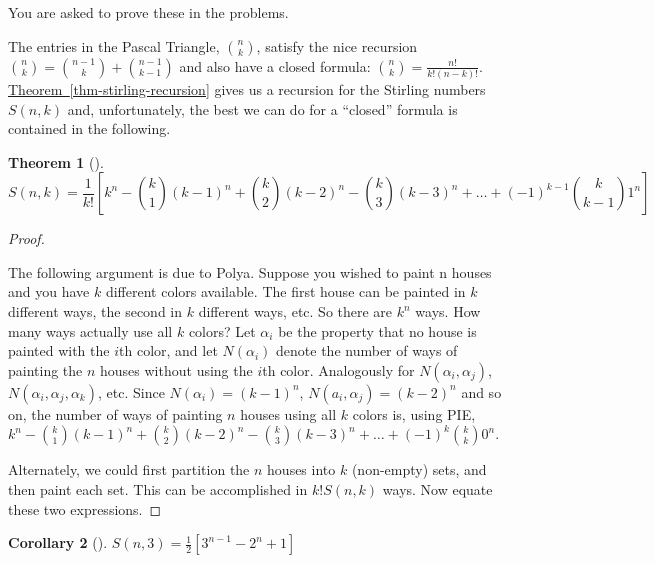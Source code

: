 \documentclass[10pt,]{book}
\theoremstyle{plain}
\newtheorem{theorem}{Theorem}[section]
\newtheorem{corollary}[theorem]{Corollary}
\theoremstyle{definition}
\theoremstyle{definition}
\numberwithin{equation}{chapter}
\begin{document}
\hypertarget{p-120}{}%
You are asked to prove these in the problems.%
\par
\hypertarget{p-121}{}%
The entries in the Pascal Triangle, \(\binom{n}{k}\), satisfy the nice recursion \(\binom{n}{k} = \binom{n - 1}{k} + \binom{n - 1}{k - 1}\) and also have a closed formula: \(\binom{n}{k} = \frac{n!}{k!(n - k)!}\). \hyperref[thm-stirling-recursion]{Theorem~\ref{thm-stirling-recursion}} gives us a recursion for the Stirling numbers \(S(n,k)\) and, unfortunately, the best we can do for a ``closed'' formula is contained in the following.%
\begin{theorem}[{}]\label{thm-stirling-closed}
\hypertarget{p-122}{}%
%
\begin{equation*}
S(n,k) = \frac{1}{k!}\left[k^{n} - \binom{k}{1} \left( k - 1 \right)^{n} + \binom{k}{2} \left( k - 2 \right)^{n} - \binom{k}{3} \left( k - 3 \right)^{n} + \ldots + \left( - 1 \right)^{k - 1}\binom{k}{k - 1} 1^{n} \right] 
\end{equation*}
%
\end{theorem}
\begin{proof}\hypertarget{proof-2}{}
\hypertarget{p-123}{}%
The following argument is due to Polya. Suppose you wished to paint n houses and you have \(k\) different colors available. The first house can be painted in \(k\) different ways, the second in \(k\) different ways, etc. So there are \(k^{n}\) ways. How many ways actually use all \(k\) colors? Let \(\alpha_{i}\) be the property that no house is painted with the \(i\)th color, and let \(N(\alpha_{i})\) denote the number of ways of painting the \(n\) houses without using the \(i\)th color. Analogously for \(N(\alpha_{i},\alpha_{j})\), \(N(\alpha_{i},\alpha_{j},\alpha_{k})\), etc. Since \(N(\alpha_{i}) = (k - 1)^{n}\), \(N(a_{i},\alpha_{j}) = ( k - 2)^{n}\) and so on, the number of ways of painting \(n\) houses using all \(k\) colors is, using PIE, \(k^{n} -\binom{k}{1} \left(k - 1 \right)^{n} + \binom{k}{2} \left( k - 2 \right)^{n} - \binom{k}{3}      \left( k - 3 \right)^{n} + \ldots + \left( - 1 \right)^{k}\binom{k}{k} 0^{n}\).%
\par
\hypertarget{p-124}{}%
Alternately, we could first partition the \(n\) houses into \(k\) (non-empty) sets, and then paint each set. This can be    accomplished in \(k!S(n,k)\) ways. Now equate these two expressions.%
\end{proof}
\begin{corollary}[{}]\label{corollary-1}
\hypertarget{p-125}{}%
\(S\left( n,3 \right) = \frac{1}{2}\left\lbrack 3^{n - 1} - 2^{n} + 1 \right\rbrack\)%
\end{corollary}
\end{document}
